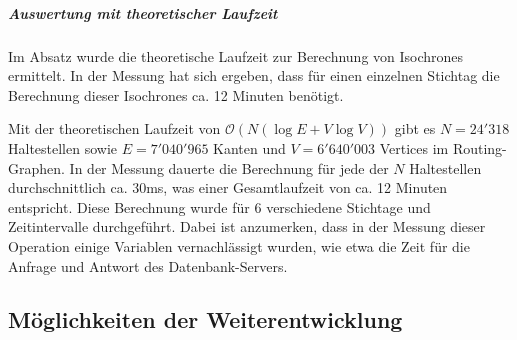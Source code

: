 \subparagraph{Auswertung mit theoretischer Laufzeit}
Im Absatz  wurde die theoretische Laufzeit zur Berechnung von \glspl{Isochrone} ermittelt.
In der Messung hat sich ergeben, dass für einen einzelnen Stichtag die Berechnung dieser \glspl{Isochrone} ca. 12 Minuten benötigt.

Mit der theoretischen Laufzeit von $\mathcal{O}(N (\log E + V \log V))$ gibt es $N = 24'318$ Haltestellen sowie $E = 7'040'965$ Kanten und $V = 6'640'003$ Vertices im Routing-Graphen.
In der Messung dauerte die Berechnung für jede der $N$ Haltestellen durchschnittlich ca. 30ms, was einer Gesamtlaufzeit von ca. 12 Minuten entspricht.
Diese Berechnung wurde für 6 verschiedene Stichtage und Zeitintervalle durchgeführt.
Dabei ist anzumerken, dass in der Messung dieser Operation einige Variablen vernachlässigt wurden, wie etwa die Zeit für die Anfrage und Antwort des Datenbank-Servers.

\subsection{Möglichkeiten der Weiterentwicklung}
\label{Resultate und Weiterentwicklung:Möglichkeiten der Weiterentwicklung}


